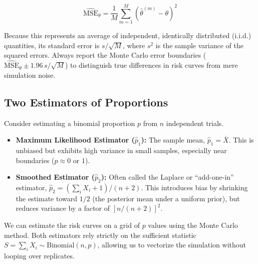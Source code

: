 \documentclass[
  letterpaper,
  DIV=11,
  numbers=noendperiod]{scrreprt}
\providecommand{\tightlist}{%
  \setlength{\itemsep}{0pt}\setlength{\parskip}{0pt}}
\begin{document}
\[\widehat{\mathrm{MSE}}_{\theta} = \frac{1}{M} \sum_{m=1}^{M} \left(\hat\theta^{(m)} - \theta\right)^{2}\]

Because this represents an average of independent, identically
distributed (i.i.d.) quantities, its standard error is \(s/\sqrt{M}\),
where \(s^{2}\) is the sample variance of the squared errors. Always
report the Monte Carlo error boundaries
(\(\widehat{\mathrm{MSE}}_{\theta} \pm 1.96\, s/\sqrt{M}\)) to
distinguish true differences in risk curves from mere simulation noise.

\subsection{Two Estimators of
Proportions}\label{two-estimators-of-proportions}

Consider estimating a binomial proportion \(p\) from \(n\) independent
trials.

\begin{itemize}
\tightlist
\item
  \textbf{Maximum Likelihood Estimator (\(\hat{p}_1\)):} The sample
  mean, \(\hat{p}_1 = \bar{X}\). This is unbiased but exhibits high
  variance in small samples, especially near boundaries (\(p \approx 0\)
  or \(1\)).
\item
  \textbf{Smoothed Estimator (\(\hat{p}_2\)):} Often called the Laplace
  or ``add-one-in'' estimator, \(\hat{p}_2 = (\sum_i X_i + 1)/(n + 2)\).
  This introduces bias by shrinking the estimate toward \(1/2\) (the
  posterior mean under a uniform prior), but reduces variance by a
  factor of \([n/(n+2)]^2\).
\end{itemize}

We can estimate the risk curves on a grid of \(p\) values using the
Monte Carlo method. Both estimators rely strictly on the sufficient
statistic \(S = \sum_i X_i \sim \mathrm{Binomial}(n, p)\), allowing us
to vectorize the simulation without looping over replicates.
\end{document}

